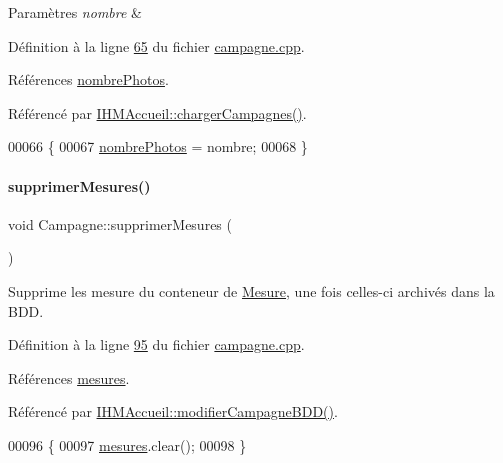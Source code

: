 \begin{DoxyParams}{Paramètres}
{\em nombre} & \\
\hline
\end{DoxyParams}


Définition à la ligne \hyperlink{campagne_8cpp_source_l00065}{65} du fichier \hyperlink{campagne_8cpp_source}{campagne.\+cpp}.



Références \hyperlink{campagne_8h_source_l00048}{nombre\+Photos}.



Référencé par \hyperlink{ihmaccueil_8cpp_source_l00130}{I\+H\+M\+Accueil\+::charger\+Campagnes()}.


\begin{DoxyCode}
00066 \{
00067     \hyperlink{class_campagne_a3696e02e3cefc30bf4f284152917718b}{nombrePhotos} = nombre;
00068 \}
\end{DoxyCode}
\mbox{\label{class_campagne_a77066423e53f99bb6cd39fd25a6f2b5f}} 
\paragraph{\texorpdfstring{supprimer\+Mesures()}{supprimerMesures()}}
{\footnotesize\ttfamily void Campagne\+::supprimer\+Mesures (\begin{DoxyParamCaption}{ }\end{DoxyParamCaption})}



Supprime les mesure du conteneur de \hyperlink{struct_mesure}{Mesure}, une fois celles-\/ci archivés dans la B\+DD. 



Définition à la ligne \hyperlink{campagne_8cpp_source_l00095}{95} du fichier \hyperlink{campagne_8cpp_source}{campagne.\+cpp}.



Références \hyperlink{campagne_8h_source_l00047}{mesures}.



Référencé par \hyperlink{ihmaccueil_8cpp_source_l00295}{I\+H\+M\+Accueil\+::modifier\+Campagne\+B\+D\+D()}.


\begin{DoxyCode}
00096 \{
00097     \hyperlink{class_campagne_ac460df42e2fbc12aae7b97abbe219ad0}{mesures}.clear();
00098 \}
\end{DoxyCode}
\mbox{\label{class_campagne_ad2fc4d5863302c88ded7b58991b1398a}} 
